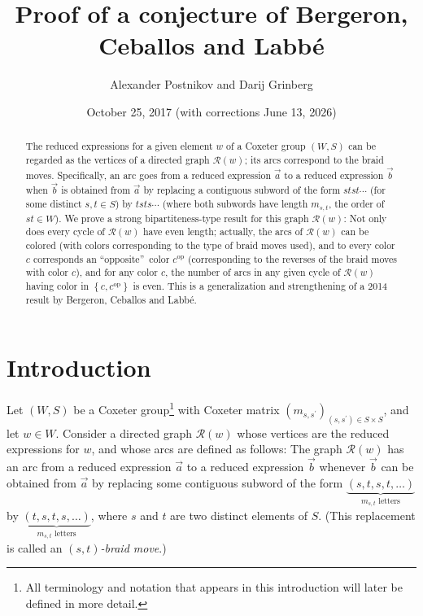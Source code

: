 \documentclass[numbers=enddot,12pt,final,onecolumn,notitlepage,abstracton]{scrartcl}%
\theoremstyle{definition}
\begin{document}
\title{Proof of a conjecture of Bergeron, Ceballos and Labb\'e}
\author{Alexander Postnikov and Darij Grinberg}
\date{October 25, 2017 (with corrections June 13, 2026)}
\maketitle

\begin{abstract}
The reduced expressions for a given element $w$ of a Coxeter group $\left(
W,S\right)  $ can be regarded as the vertices of a directed graph
$\mathcal{R}\left(  w\right)  $; its arcs correspond to the braid moves.
Specifically, an arc goes from a reduced expression $\overrightarrow{a}$ to a
reduced expression $\overrightarrow{b}$ when $\overrightarrow{b}$ is obtained
from $\overrightarrow{a}$ by replacing a contiguous subword of the form
$stst\cdots$ (for some distinct $s,t\in S$) by $tsts\cdots$ (where both
subwords have length $m_{s,t}$, the order of $st\in W$). We prove a strong
bipartiteness-type result for this graph $\mathcal{R}\left(  w\right)  $: Not
only does every cycle of $\mathcal{R}\left(  w\right)  $ have even length;
actually, the arcs of $\mathcal{R}\left(  w\right)  $ can be colored (with
colors corresponding to the type of braid moves used), and to every color $c$
corresponds an \textquotedblleft opposite\textquotedblright\ color
$c^{\operatorname*{op}}$ (corresponding to the reverses of the braid moves
with color $c$), and for any color $c$, the number of arcs in any given cycle
of $\mathcal{R}\left(  w\right)  $ having color in $\left\{
c,c^{\operatorname*{op}}\right\}  $ is even. This is a generalization and
strengthening of a 2014 result by Bergeron, Ceballos and Labb\'{e}.

\end{abstract}

\section*{Introduction}

Let $\left(  W,S\right)  $ be a Coxeter group\footnote{All terminology and
notation that appears in this introduction will later be defined in more
detail.} with Coxeter matrix $\left(  m_{s,s^{\prime}}\right)  _{\left(
s,s^{\prime}\right)  \in S\times S}$, and let $w\in W$. Consider a directed
graph $\mathcal{R}\left(  w\right)  $ whose vertices are the reduced
expressions for $w$, and whose arcs are defined as follows: The graph
$\mathcal{R}\left(  w\right)  $ has an arc from a reduced expression
$\overrightarrow{a}$ to a reduced expression $\overrightarrow{b}$ whenever
$\overrightarrow{b}$ can be obtained from $\overrightarrow{a}$ by replacing
some contiguous subword of the form $\underbrace{\left(  s,t,s,t,\ldots
\right)  }_{m_{s,t}\text{ letters}}$ by $\underbrace{\left(  t,s,t,s,\ldots
\right)  }_{m_{s,t}\text{ letters}}$, where $s$ and $t$ are two distinct
elements of $S$. (This replacement is called an $\left(  s,t\right)
$\emph{-braid move}.)
\end{document}

